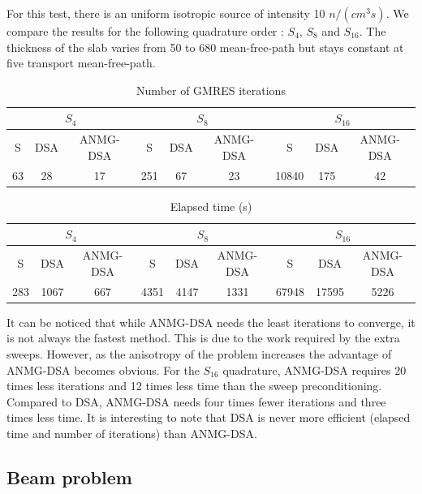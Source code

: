 \documentclass[preprint,10pt]{elsarticle}
\renewcommand{\(}{\left(}
\renewcommand{\)}{\right)}
\renewcommand{\[}{\left[}
\renewcommand{\]}{\right]}
\begin{document}
For this test, there is an uniform isotropic source of intensity 10 $n/(cm^3s)$. 
We compare the results for the following quadrature order : $S_4$, $S_8$ and 
$S_{16}$. The thickness of the slab varies from
50 to 680 mean-free-path but stays constant at five transport mean-free-path.
\begin{table}[H]
\begin{center}
\begin{tabular}{|c|c|c|c|c|c|c|c|c|}
\hline
\multicolumn{3}{|c|}{$S_4$} & \multicolumn{3}{c|}{$S_8$} & 
\multicolumn{3}{c|}{$S_{16}$} \\
\hline  
S & DSA & ANMG-DSA & S & DSA & ANMG-DSA & S & DSA & ANMG-DSA\\
\hline
63 & 28 & 17 & 251 & 67 & 23 & 10840 & 175 & 42 \\
\hline
\end{tabular}
\caption{Number of GMRES iterations}
\end{center}
\end{table}
\begin{table}[H]
\begin{center}
\begin{tabular}{|c|c|c|c|c|c|c|c|c|}
\hline
\multicolumn{3}{|c|}{$S_4$} & \multicolumn{3}{c|}{$S_8$} & 
\multicolumn{3}{c|}{$S_{16}$} \\
\hline  
S & DSA & ANMG-DSA & S & DSA & ANMG-DSA & S & DSA & ANMG-DSA\\
\hline
283 & 1067 & 667 & 4351 & 4147 & 1331 & 67948 & 17595 & 5226 \\
\hline
\end{tabular}
\caption{Elapsed time (s)}
\end{center}
\end{table}
It can be noticed that while ANMG-DSA needs the least iterations to converge, it is
not always the fastest method. This is due to the work required by the extra
sweeps. However, as the anisotropy of the problem increases the advantage of
ANMG-DSA becomes obvious. For the $S_{16}$ quadrature, ANMG-DSA requires 20 times 
less iterations and 12 times less time than the sweep preconditioning. 
Compared to DSA, ANMG-DSA needs four times fewer iterations and three times less 
time. It is interesting to note that DSA is never more efficient (elapsed
time and number of iterations) than ANMG-DSA.

\subsection{Beam problem}
\end{document}
